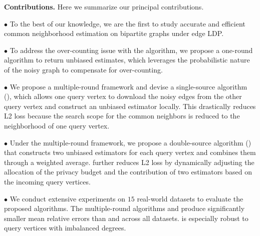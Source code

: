 \noindent
{\bf Contributions.} Here we summarize our principal contributions. 

\noindent 
{\em $\bullet$} To the best of our knowledge, we are the first to study accurate and efficient common neighborhood estimation on bipartite graphs under edge LDP. 


\noindent 
{\em $\bullet$} 
To address the over-counting issue with the \naive algorithm, we propose a one-round algorithm \bs to return unbiased estimates, which leverages the probabilistic nature of the noisy graph to compensate for over-counting. 

\noindent 
{\em $\bullet$} 
We propose a multiple-round framework and devise a single-source algorithm (\advss), 
which allows one query vertex to download the noisy edges from the other query vertex and construct an unbiased estimator locally. 
This drastically reduces L2 loss because the search scope for the common neighbors is reduced to the neighborhood of one query vertex. 


\noindent 
{\em $\bullet$} 
Under the multiple-round framework, we propose a double-source algorithm (\advds) that constructs two unbiased estimators for each query vertex and combines them through a weighted average. \advds further reduces L2 loss by dynamically adjusting the allocation of the privacy budget and the contribution of two estimators based on the incoming query vertices. 


\noindent 
{\em $\bullet$}
We conduct extensive experiments on $15$ real-world datasets to evaluate the proposed algorithms. The multiple-round algorithms \advss and \advds produce significantly smaller mean relative errors than \naive and \bs across all datasets. 
\advds is especially robust to query vertices with imbalanced degrees. 




